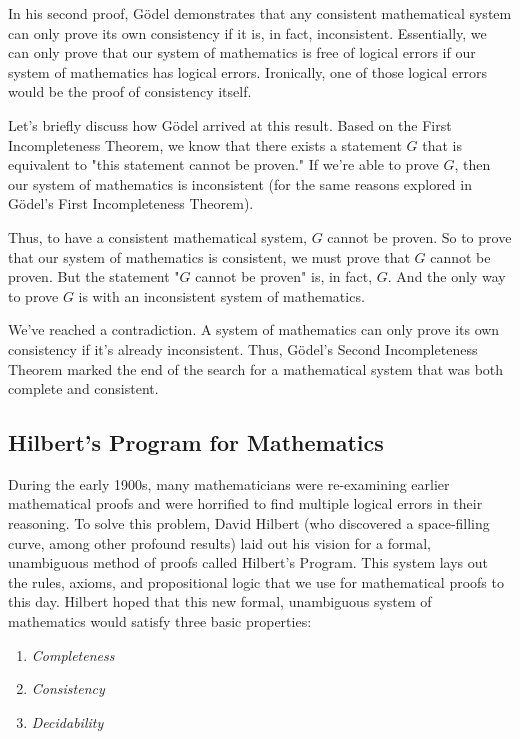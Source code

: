\documentclass[conference]{IEEEtran}
\begin{document}
In his second proof, Gödel demonstrates that any consistent mathematical system can only prove its own consistency if it is, in fact, inconsistent. Essentially, we can only prove that our system of mathematics is free of logical errors if our system of mathematics has logical errors. Ironically, one of those logical errors would be the proof of consistency itself.

Let's briefly discuss how Gödel arrived at this result. Based on the First Incompleteness Theorem, we know that there exists a statement $G$ that is equivalent to "this statement cannot be proven." If we're able to prove $G$, then our system of mathematics is inconsistent (for the same reasons explored in Gödel's First Incompleteness Theorem). 

Thus, to have a consistent mathematical system, $G$ cannot be proven. So to prove that our system of mathematics is consistent, we must prove that $G$ cannot be proven. But the statement "$G$ cannot be proven" is, in fact, $G$. And the only way to prove $G$ is with an inconsistent system of mathematics.

We've reached a contradiction. A system of mathematics can only prove its own consistency if it's already inconsistent. Thus, Gödel's Second Incompleteness Theorem marked the end of the search for a mathematical system that was both complete and consistent. 

\subsection{Hilbert's Program for Mathematics} 
During the early 1900s, many mathematicians were re-examining earlier mathematical proofs and were horrified to find multiple logical errors in their reasoning. To solve this problem, David Hilbert (who discovered a space-filling curve, among other profound results) laid out his vision for a formal, unambiguous method of proofs called Hilbert's Program. This system lays out the rules, axioms, and propositional logic that we use for mathematical proofs to this day. Hilbert hoped that this new formal, unambiguous system of mathematics would satisfy three basic properties: 

\begin{enumerate}[]
    \item \emph{Completeness}
    \item \emph{Consistency}
    \item \emph{Decidability}
\end{enumerate}
\end{document}
